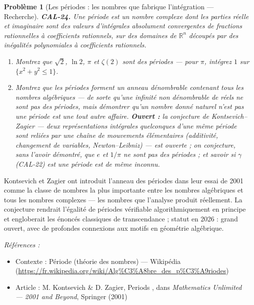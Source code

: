 \documentclass[11pt]{article}
\newtheorem{problem}{Problème}
\newenvironment{refs}{\par\small\noindent\emph{Références :}\begin{itemize}\setlength\itemsep{0pt}}{\end{itemize}\normalsize}
\begin{document}
\bigskip

\begin{problem}[{Les périodes : les nombres que fabrique l'intégration --- Recherche}]
\textbf{CAL-24.} Une \textit{période} est un nombre complexe dont les parties réelle et
imaginaire sont des valeurs d'intégrales absolument convergentes de fractions rationnelles à
coefficients rationnels, sur des domaines de $ \mathbb{R}^n $ découpés par des inégalités
polynomiales à coefficients rationnels.
\begin{enumerate}
\item[(i)] Montrez que $ \sqrt{2} $, $ \ln 2 $, $\pi$
et $ \zeta(2) $ sont des périodes --- pour $\pi$, intégrez $ 1 $ sur
$ \{x^2+y^2\le 1\} $.
\item[(ii)] Montrez que les périodes forment un anneau dénombrable contenant tous les
nombres algébriques --- de sorte qu'une infinité non dénombrable de réels ne sont pas des périodes, mais démontrer qu'un
nombre \textit{donné} naturel n'est pas une période est une tout autre affaire.
\textbf{Ouvert :} la conjecture de Kontsevich--Zagier --- deux représentations intégrales quelconques d'une
même période sont reliées par une chaîne de mouvements élémentaires (additivité, changement de variables,
Newton--Leibniz) --- est ouverte ; on conjecture, sans l'avoir démontré, que $ e $ et $ 1/\pi $
ne sont pas des périodes ; et savoir si $\gamma$ (CAL-22) est une période est de même inconnu.
\end{enumerate}

\end{problem}

\noindent Kontsevich et Zagier ont introduit l'anneau des périodes dans leur essai de 2001
comme \og{} la classe de nombres la plus importante entre les nombres algébriques et tous les nombres
complexes \fg{} --- les nombres que l'analyse produit réellement. La conjecture rendrait l'égalité
de périodes vérifiable algorithmiquement en principe et engloberait les énoncés classiques de
transcendance ; statut en 2026 : grand ouvert, avec de profondes connexions aux motifs
en géométrie algébrique.

\begin{refs}
\item Contexte : Période (théorie des nombres) --- Wikipédia (\url{https://fr.wikipedia.org/wiki/Alg%C3%A8bre_des_p%C3%A9riodes})
\item Article : M. Kontsevich \& D. Zagier, \og{} Periods \fg{}, dans \textit{Mathematics Unlimited --- 2001 and Beyond}, Springer (2001)
\end{refs}
\end{document}
